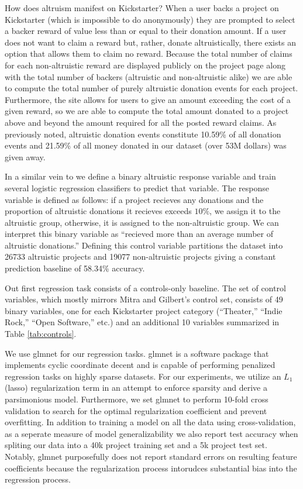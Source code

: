 \documentclass[letterpaper]{article}
\begin{document}
How does altruism manifest on Kickstarter? When a user backs a project on Kickstarter (which is impossible to do anonymously) they are prompted to select a backer reward of value less than or equal to their donation amount. If a user does not want to claim a reward but, rather, donate altruistically, there exists an option that allows them to claim no reward. Because the total number of claims for each non-altruistic reward are displayed publicly on the project page along with the total number of backers (altruistic and non-altruistic alike) we are able to compute the total number of purely altruistic donation events for each project. Furthermore, the site allows for users to give an amount exceeding the cost of a given reward, so we are able to compute the total amount donated to a project above and beyond the amount required for all the posted reward claims. As previously noted, altruistic donation events constitute 10.59\% of all donation events and 21.59\% of all money donated in our dataset (over 53M dollars) was given away.

In a similar vein to \cite{mitra2014language} we define a binary altruistic response variable and train several logistic regression classifiers to predict that variable. The response variable is defined as follows: if a project recieves any donations and the proportion of altruistic donations it recieves exceeds $10\%$, we assign it to the altruistic group, otherwise, it is assigned to the non-altruistic group. We can interpret this binary variable as ``recieved more than an average number of altruistic donations.'' Defining this control variable partitions the dataset into 26733 altruistic projects and 19077 non-altruistic projects giving a constant prediction baseline of 58.34\% accuracy.

Out first regression task consists of a controls-only baseline. The set of control variables, which mostly mirrors Mitra and Gilbert's control set, consists of 49 binary variables, one for each Kickstarter project category (``Theater,'' ``Indie Rock,'' ``Open Software,'' etc.) and an additional 10 variables summarized in Table \ref{tab:controls}.

We use glmnet \cite{friedman2010glmnet} for our regression tasks. glmnet is a software package that implements cyclic coordinate decent and is capable of performing penalized regression tasks on highly sparse datasets. For our experiments, we utilize an $L_1$ (lasso) regularization term in an attempt to enforce sparsity and derive a parsimonious model. Furthermore, we set glmnet to perform 10-fold cross validation to search for the optimal regularization coefficient and prevent overfitting. In addition to training a model on all the data using cross-validation, as a seperate measure of model generalizability we also report test accuracy when spliting our data into a 40k project training set and a 5k project test set. Notably, glmnet purposefully does not report standard errors on resulting feature coefficients because the regularization process intorudces substantial bias into the regression process.
\end{document}

